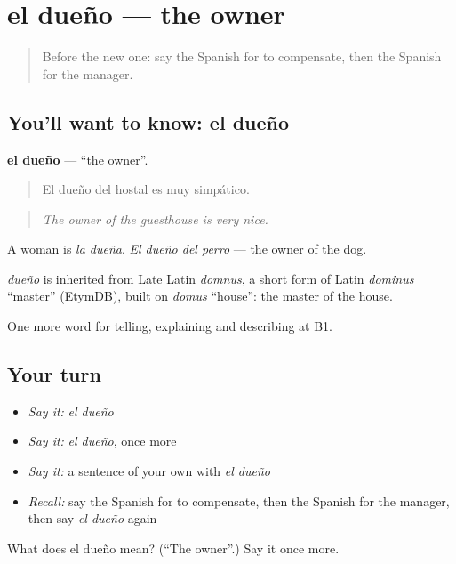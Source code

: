 \section[el dueño]{el dueño — the owner}

\label{lesson:ES-C665-dueno}



\begin{quote}
Before the new one: say the Spanish for to compensate, then the Spanish for the manager.
\end{quote}

\subsection*{You'll want to know: el dueño}
\textbf{el dueño} — \textquotedblleft{}the owner\textquotedblright{}.

\begin{quote}
El dueño del hostal es muy simpático.
\end{quote}

\begin{quote}
\emph{The owner of the guesthouse is very nice.}
\end{quote}

A woman is \emph{la dueña}. \emph{El dueño del perro} — the owner of the dog.

\begin{cousinweb}
\emph{dueño} is inherited from Late Latin \emph{domnus}, a short form of Latin \emph{dominus} \textquotedblleft{}master\textquotedblright{} (EtymDB), built on \emph{domus} \textquotedblleft{}house\textquotedblright{}: the master of the house.
\end{cousinweb}

\begin{grammarlens}[title={What you've built}]
One more word for telling, explaining and describing at B1.
\end{grammarlens}

\subsection*{Your turn}
\begin{itemize}
\raggedright
  \item \emph{Say it:} \emph{el dueño}
  \item \emph{Say it:} \emph{el dueño}, once more
  \item \emph{Say it:} a sentence of your own with \emph{el dueño}
  \item \emph{Recall:} say the Spanish for to compensate, then the Spanish for the manager, then say \emph{el dueño} again
\end{itemize}

\begin{tcolorbox}[breakable,colback=teal!4,colframe=teal!35!black,title={Before you move on}]
What does el dueño mean? (\textquotedblleft{}The owner\textquotedblright{}.) Say it once more.
\end{tcolorbox}
